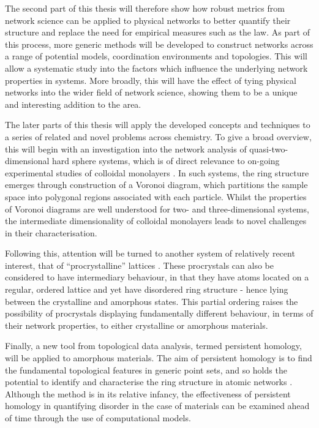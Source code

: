 The second part of this thesis will therefore show how robust metrics from network science can be applied to physical \td{} networks to better quantify their structure and replace the need for empirical measures such as the \aw{} law.
As part of this process, more generic methods will be developed to construct \td{} networks across a range of potential models, coordination environments and topologies.
This will allow a systematic study into the factors which influence the underlying network properties in \td{} systems.
More broadly, this will have the effect of tying physical \td{} networks into the wider field of network science, showing them to be a unique and interesting addition to the area.

The later parts of this thesis will apply the developed concepts and techniques to a series of related and novel problems across chemistry.
To give a broad overview, this will begin with an investigation into the network analysis of quasi\--two\--dimensional hard sphere systems, which is of direct relevance to on\--going experimental studies of colloidal monolayers \cite{Thorneywork2017}.
In such systems, the ring structure emerges through construction of a Voronoi diagram, which partitions the sample space into polygonal regions associated with each particle.
Whilst the properties of Voronoi diagrams are well understood for two\-- and three\--dimensional systems, the intermediate dimensionality of colloidal monolayers leads to novel challenges in their characterisation.

Following this, attention will be turned to another system of relatively recent interest, that of ``procrystalline'' lattices \cite{Overy2016}.
These procrystals can also be considered to have intermediary behaviour, in that they have atoms located on a regular, ordered lattice and yet have disordered ring structure - hence lying between the crystalline and amorphous states.
This partial ordering raises the possibility of procrystals displaying fundamentally different behaviour, in terms of their network properties, to either crystalline or amorphous materials.

Finally, a new tool from topological data analysis, termed persistent homology, will be applied to \td{} amorphous materials.
The aim of persistent homology is to find the fundamental topological features in generic point sets, and so holds the potential to identify and characterise the ring structure in atomic networks \cite{Wasserman2018}.
Although the method is in its relative infancy, the effectiveness of persistent homology in quantifying disorder in the case of \td{} materials can be examined ahead of time through the use of computational models.

